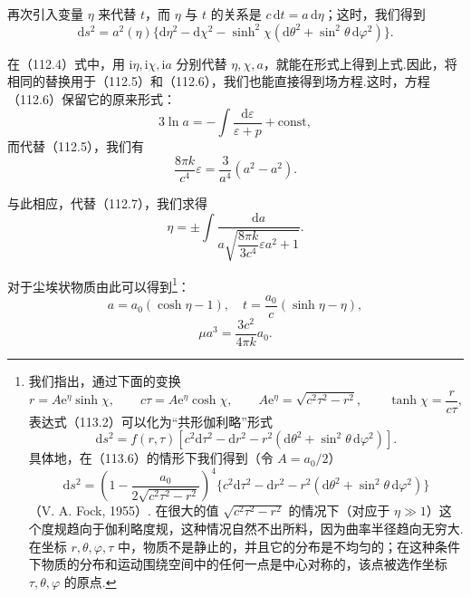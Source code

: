 再次引入变量 $\eta$ 来代替 $t$，而 $\eta$ 与 $t$ 的关系是 $c\,\mathrm{d}t=a\,\mathrm{d}\eta$；这时，我们得到
\begin{equation}
  \mathrm{d}s^{2}=a^{2}(\eta)\{\mathrm{d}\eta^{2}-\mathrm{d}\chi^{2}
  -\sinh^{2}\chi(\mathrm{d}\theta^{2}+\sin^{2}\theta\,\mathrm{d}\varphi^{2})\}.
\end{equation}

在（112.4）式中，用 $\mathrm{i}\eta,\mathrm{i}\chi,\mathrm{i}a$ 分别代替 $\eta,\chi,a$，就能在形式上得到上式.因此，将相同的替换用于（112.5）和（112.6），我们也能直接得到场方程.这时，方程（112.6）保留它的原来形式：
\begin{equation}
  3\ln a=-\int\frac{\mathrm{d}\varepsilon}{\varepsilon+p}+\mathrm{const},
\end{equation}
而代替（112.5），我们有
\begin{equation}
  \frac{8\pi k}{c^{4}}\varepsilon=\frac{3}{a^{4}}(a^{2}-a^{2}).
\end{equation}

与此相应，代替（112.7），我们求得
\begin{equation}
  \eta=\pm\int\frac{\mathrm{d}a}
  {a\sqrt{\dfrac{8\pi k}{3c^{4}}\varepsilon a^{2}+1}}.
\end{equation}

对于尘埃状物质由此可以得到\footnote{我们指出，通过下面的变换
\[
r=A\mathrm{e}^{\eta}\sinh\chi,\qquad
c\tau=A\mathrm{e}^{\eta}\cosh\chi,\qquad
A\mathrm{e}^{\eta}=\sqrt{c^{2}\tau^{2}-r^{2}},\qquad
\tanh\chi=\frac{r}{c\tau},
\]
表达式（113.2）可以化为“共形伽利略”形式
\[
\mathrm{d}s^{2}=f(r,\tau)[c^{2}\mathrm{d}\tau^{2}-\mathrm{d}r^{2}-r^{2}(\mathrm{d}\theta^{2}+\sin^{2}\theta\,\mathrm{d}\varphi^{2})].
\]
具体地，在（113.6）的情形下我们得到（令 $A=a_{0}/2$）
\[
\mathrm{d}s^{2}=\left(1-\frac{a_{0}}{2\sqrt{c^{2}\tau^{2}-r^{2}}}\right)^{4}
\{c^{2}\mathrm{d}\tau^{2}-\mathrm{d}r^{2}-r^{2}(\mathrm{d}\theta^{2}+\sin^{2}\theta\,\mathrm{d}\varphi^{2})\}
\]
（V. A. Fock, 1955）. 在很大的值 $\sqrt{c^{2}\tau^{2}-r^{2}}$ 的情况下（对应于 $\eta\gg1$）这个度规趋向于伽利略度规，这种情况自然不出所料，因为曲率半径趋向无穷大.
在坐标 $r,\theta,\varphi,\tau$ 中，物质不是静止的，并且它的分布是不均匀的；在这种条件下物质的分布和运动围绕空间中的任何一点是中心对称的，该点被选作坐标 $\tau,\theta,\varphi$ 的原点.}：
\begin{equation}
  a=a_{0}(\cosh\eta-1),\quad t=\frac{a_{0}}{c}(\sinh\eta-\eta),
\end{equation}
\begin{equation}
  \mu a^{3}=\frac{3c^{2}}{4\pi k}a_{0}.
\end{equation}


